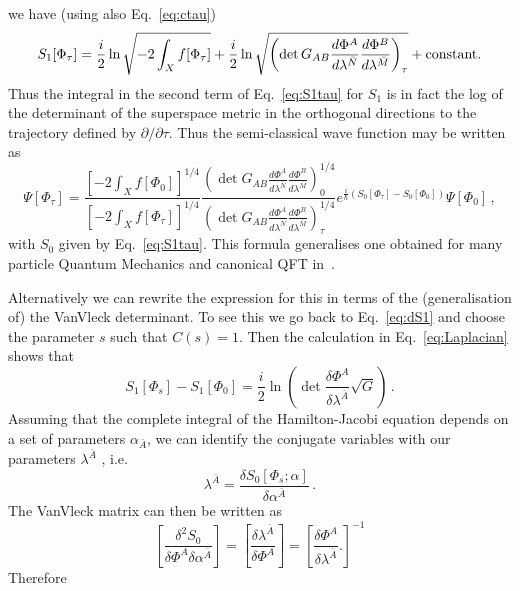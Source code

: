 \documentclass[a4paper,11pt]{article}
\numberwithin{equation}{section}
\begin{document}
we have (using also Eq.~\eqref{eq:ctau}) 
\begin{equation}
S_{1}[\Phi_{\tau}]=\frac{i}{2}\ln\sqrt{-2\int_{X}f[\Phi_{\tau}]}+\frac{i}{2}\ln\sqrt{\left(\det G_{AB}\frac{d\Phi^{A}}{d\lambda^{\bar{N}}}\frac{d\Phi^{B}}{d\lambda^{\bar{M}}}\right)_{\tau}}+{\rm constant}.\label{eq:S1-2}
\end{equation}
Thus the integral in the second term of Eq.~\eqref{eq:S1tau} for $S_1$ is in fact the log of the determinant of the superspace metric in the orthogonal directions to the trajectory defined by $\partial/\partial\tau$. Thus the semi-classical wave function may be written as 
\begin{equation}
\boxed{\quad \Psi[\Phi_{\tau}]=\frac{\left[-2\int_{X}f[\Phi_{0}]\right]^{1/4}}{\left[-2\int_{X}f[\Phi_{\tau}]\right]^{1/4}}\frac{\left(\det G_{AB}\frac{d\Phi^{A}}{d\lambda^{\bar{N}}}\frac{d\Phi^{B}}{d\lambda^{\bar{M}}}\right)_{0}^{1/4}}{\left(\det G_{AB}\frac{d\Phi^{A}}{d\lambda^{\bar{N}}}\frac{d\Phi^{B}}{d\lambda^{\bar{M}}}\right)_{\tau}^{1/4}}e^{\frac{i}{\hbar}\left(S_{0}\left[\Phi_{\tau}\right]-S_{0}[\Phi_{0}]\right)}\Psi[\Phi_{0}] \,,\quad}\label{eq:Psi1}
\end{equation}
 with $S_{0}$ given by Eq.~\eqref{eq:S1tau}. This formula generalises one obtained for many particle Quantum Mechanics and canonical QFT in~\cite{Banks:1973ps,Banks:1974ij, Gervais:1977nv, Tanaka:1993ez}.

Alternatively we can rewrite the expression for this in terms of the
(generalisation of) the VanVleck determinant. To see this we go back to Eq.~\eqref{eq:dS1} and choose the parameter $s$ such that $C(s)=1$. Then the calculation in Eq.~\eqref{eq:Laplacian} shows that 
\begin{equation}
S_{1}[\Phi_{s}]-S_{1}\left[\Phi_{0}\right]=\frac{i}{2}\ln\left(\det\frac{\delta\Phi^{A}}{\delta\lambda^{\bar{A}}}\sqrt{G}\right) \,.
\end{equation}
Assuming that the complete integral of the Hamilton-Jacobi equation depends on a set of parameters $\alpha_{\bar{A}}$, we can identify the conjugate variables with our parameters $\lambda^{\bar{A}}$ , i.e.
\begin{equation}
\lambda^{\bar{A}}=\frac{\delta S_{0}[\Phi_{s};\alpha]}{\delta\alpha^{\bar{A}}} \,.\label{eq:lambdaconj}
\end{equation}
The VanVleck matrix can then be written as 
\begin{equation}
\left[\frac{\delta^{2}S_{0}}{\delta\Phi^{A}\delta\alpha^{\bar{A}}}\right]=\left[\frac{\delta\lambda^{\bar{A}}}{\delta\Phi^{A}}\right]=\left[\frac{\delta\Phi^{A}}{\delta\lambda^{\bar{A}}}.\right]^{-1}
\end{equation}
Therefore
\end{document}
